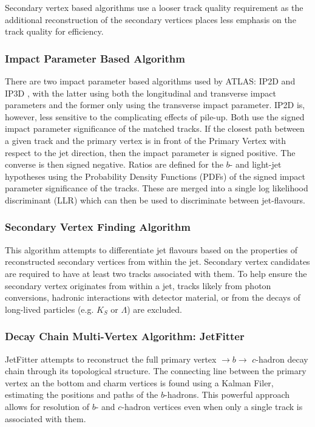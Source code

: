 Secondary vertex based algorithms use a looser track quality requirement as the additional reconstruction of the secondary vertices places less emphasis on the track quality for efficiency.
\subsubsection{Impact Parameter Based Algorithm}
There are two impact parameter based algorithms used by ATLAS: IP2D \cite{IP?D} and IP3D \cite{IP?D}, with the latter using both the longitudinal and transverse impact parameters and the former only using the transverse impact parameter. IP2D is, however, less sensitive to the complicating effects of pile-up. Both use the signed impact parameter significance of the matched tracks. If the closest path between a given track and the primary vertex is in front of the Primary Vertex with respect to the jet direction, then the impact parameter is signed positive. The converse is then signed negative. Ratios are defined for the $b$- and light-jet hypotheses using the Probability Density Functions (PDFs) of the signed impact parameter significance of the tracks. These are merged into a single log likelihood discriminant (LLR) which can then be used to discriminate between jet-flavours.
\subsubsection{Secondary Vertex Finding Algorithm}
This algorithm attempts to differentiate jet flavours based on the properties of reconstructed secondary vertices from within the jet. Secondary vertex candidates are required to have at least two tracks associated with them. To help ensure the secondary vertex originates from within a jet, tracks likely from photon conversions, hadronic interactions with detector material, or from the decays of long-lived particles (e.g. $K_{S}$ or $\Lambda$) are excluded. 
\subsubsection{Decay Chain Multi-Vertex Algorithm: JetFitter}
JetFitter \cite{jetfitter} attempts to reconstruct the full primary vertex $\rightarrow b \rightarrow$ $c$-hadron decay chain through its topological structure. The connecting line between the primary vertex an the bottom and charm vertices is found using a Kalman Filer, estimating the positions and paths of the $b$-hadrons. This powerful approach allows for resolution of $b$- and $c$-hadron vertices even when only a single track is associated with them. 
